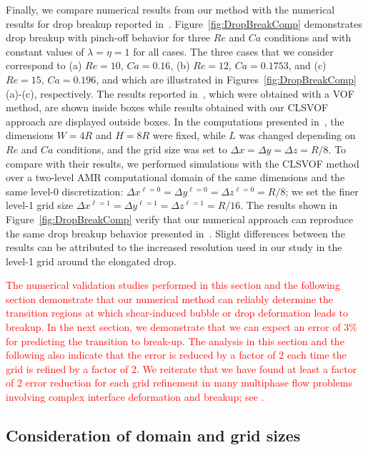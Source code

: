 \documentclass{elsarticle}
\begin{document}
Finally, we compare numerical results from our method with the numerical results for drop breakup reported in~\citet{RenCri01-2}.  Figure~\ref{fig:DropBreakComp} demonstrates drop breakup with pinch-off behavior for three $Re$ and $Ca$ conditions and with constant values of $\lambda = \eta = 1$ for all cases.  The three cases that we consider correspond to (a) $Re = 10, \, Ca = 0.16$, (b) $Re = 12, \, Ca = 0.1753$, and (c) $Re = 15, \, Ca = 0.196$, and which are illustrated in Figures~\ref{fig:DropBreakComp}(a)-(c), respectively.  The results reported in~\citet{RenCri01-2}, which were obtained with a VOF method, are shown inside boxes while results obtained with our CLSVOF approach are displayed outside boxes.  In the computations presented in~\citet{RenCri01-2}, the dimensions $W=4R$ and $H=8R$ were fixed, while $L$ was changed depending on $Re$ and $Ca$ conditions, and the grid size was set to $\Delta x=\Delta y=\Delta z=R/8$.  To compare with their results, we performed simulations with the CLSVOF method over a two-level AMR computational domain of the same dimensions and the same level-0 discretization: $\Delta x^{\ell=0} = \Delta y^{\ell=0} = \Delta z^{\ell=0} = R/8$; we set the finer level-1 grid size $\Delta x^{\ell=1} = \Delta y^{\ell=1} = \Delta z^{\ell=1} = R/16$.  The results shown in Figure~\ref{fig:DropBreakComp} verify that our numerical approach can reproduce the same drop breakup behavior presented in~\citet{RenCri01-2}.  Slight differences between the results can be attributed to the increased resolution used in our study in the level-1 grid around the elongated drop. 

\textcolor{red}{
The numerical validation studies performed in this section and the following section demonstrate that our numerical method can reliably determine the transition regions at which shear-induced bubble or drop deformation leads to breakup.  In the next section, we demonstrate that we can expect an error of $3\%$ for predicting the transition to break-up.  The analysis in this section and the following also indicate that the error is reduced by a factor of 2 each time the grid is refined by a factor of 2. We reiterate that we have found at least a factor of 2 error reduction for each grid refinement in many multiphase flow problems involving complex interface deformation and breakup; see \citet{OhtSus12, OhtAkaYosSus14, OhtFurYosSus19,ohta2010sensitivity,stewart2008improved,SusSmiHusOhtZhi07,arienti2013coupled,ohta2011robust}.  
}

\subsection{Consideration of domain and grid sizes}\label{sec:DomGrdSize}
\end{document}
